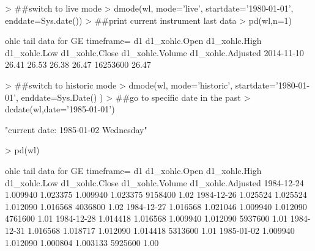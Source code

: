 \documentclass{article}
\begin{document}
\begin{Schunk}
\begin{Sinput}
> ##switch to live mode
> dmode(wl, mode='live', startdate='1980-01-01', enddate=Sys.date())
> ##print current instrument last data
> pd(wl,n=1)
\end{Sinput}
\begin{Soutput}
ohlc tail data for GE timeframe= d1 
           d1_xohlc.Open d1_xohlc.High d1_xohlc.Low d1_xohlc.Close d1_xohlc.Volume d1_xohlc.Adjusted
2014-11-10         26.41         26.53        26.38          26.47        16253600             26.47
\end{Soutput}
\begin{Sinput}
> ##switch to historic mode
> dmode(wl, mode='historic', startdate='1980-01-01', enddate=Sys.Date() )
> ##go to specific date in the past
> dcdate(wl,date='1985-01-01')
\end{Sinput}
\begin{Soutput}
[1] "current date: 1985-01-02 Wednesday"
\end{Soutput}
\begin{Sinput}
> pd(wl)
\end{Sinput}
\begin{Soutput}
ohlc tail data for GE timeframe= d1 
           d1_xohlc.Open d1_xohlc.High d1_xohlc.Low d1_xohlc.Close d1_xohlc.Volume d1_xohlc.Adjusted
1984-12-24      1.009940      1.023375     1.009940       1.023375         9158400              1.02
1984-12-26      1.025524      1.025524     1.012090       1.016568         4036800              1.02
1984-12-27      1.016568      1.021046     1.009940       1.012090         4761600              1.01
1984-12-28      1.014418      1.016568     1.009940       1.012090         5937600              1.01
1984-12-31      1.016568      1.018717     1.012090       1.014418         5313600              1.01
1985-01-02      1.009940      1.012090     1.000804       1.003133         5925600              1.00
\end{Soutput}
\end{Schunk}
\end{document}
